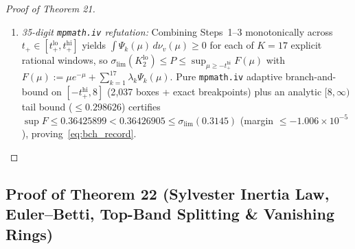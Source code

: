 \documentclass[10pt,letterpaper]{article}
\begin{document}
\begin{proof}[Proof of Theorem 21]
\begin{enumerate}[leftmargin=1.6em,itemsep=1.5pt]
  \item \emph{35-digit \texttt{mpmath.iv} refutation:} Combining Steps~1--3 monotonically across $t_+ \in [t_+^{\mathrm{lo}}, t_+^{\mathrm{hi}}]$ yields $\int \Psi_k(\mu)\,d\nu_v(\mu) \ge 0$ for each of $K = 17$ explicit rational windows, so $\sigma_{\lim}(K_2^{\mathrm{lo}}) \le P \le \sup_{\mu \ge -t_+^{\mathrm{hi}}} F(\mu)$ with $F(\mu) := \mu e^{-\mu} + \sum_{k=1}^{17}\lambda_k\Psi_k(\mu)$. Pure \texttt{mpmath.iv} adaptive branch-and-bound on $[-t_+^{\mathrm{hi}}, 8]$ (2{,}037 boxes + exact breakpoints) plus an analytic $[8, \infty)$ tail bound ($\le 0.298626$) certifies $\sup F \le 0.36425899 < 0.36426905 \le \sigma_{\lim}(0.3145)$ (margin $\le -1.006\times 10^{-5}$), proving~\eqref{eq:bch_record}.
\end{enumerate}
\end{proof}

\subsection{Proof of Theorem 22 (Sylvester Inertia Law, Euler--Betti, Top-Band Splitting \& Vanishing Rings)}
\end{document}
